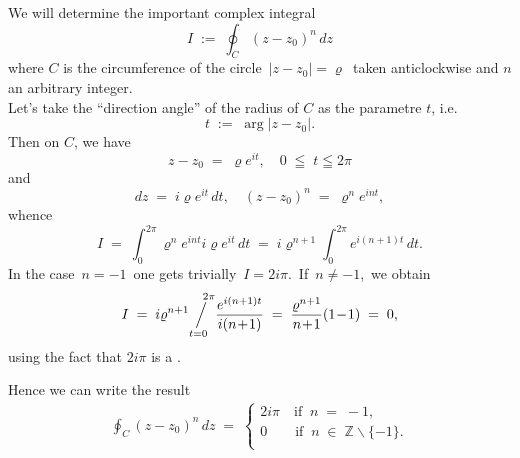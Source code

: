 \documentclass[12pt]{article}
\newcommand{\sijoitus}[2]%
{\operatornamewithlimits{\Big/}_{\!\!\!#1}^{\,#2}}
\begin{document}
We will determine the important complex integral
$$I \;:=\; \oint_C\!(z\!-\!z_0)^n\,dz$$
where $C$ is the circumference of the circle \,$|z\!-\!z_0| = \varrho$\, taken anticlockwise and $n$ an arbitrary integer.\\

Let's take the ``direction angle'' of the radius of $C$ as the parametre $t$, i.e. 
$$t \;:=\; \arg|z\!-\!z_0|.$$
Then on $C$, we have
$$z\!-\!z_0 \;=\; \varrho e^{it}, \quad 0 \;\leqq\; t \leqq 2\pi$$
and 
$$dz \;=\; i\varrho e^{it}\,dt, \quad (z\!-\!z_0)^n \;=\; \varrho^ne^{int},$$
whence
$$I \;=\; \int_0^{2\pi}\!\varrho^ne^{int}i\varrho e^{it}\,dt\;=\; i\varrho^{n+1}\!\int_0^{2\pi}\!e^{i(n+1)t}\,dt.$$
In the case \,$n = -1$\, one gets trivially\, $I = 2i\pi$.\, If\, $n \neq -1$,\, we obtain
$$I \;=\; i\varrho^{n+1}\!\!\sijoitus{t=0}{\quad 2\pi}\!\frac{e^{i(n+1)t}}{i(n\!+\!1)} 
\;=\; \frac{\varrho^{n+1}}{n\!+\!1}(1\!-\!1) \;=\; 0,$$
using the fact that $2i\pi$ is a .

Hence we can write the result
\begin{align*}
 \oint_C(z\!-\!z_0)^n\,dz \;=\;
   \begin{cases}
     2i\pi \quad \mbox{if} \;\; n \;=\; -1, \\
     0    \qquad \mbox{if} \;\; n \;\in\; \mathbb{Z}\!\smallsetminus\!\{-1\}. \\
   \end{cases}
\end{align*}





\end{document}
